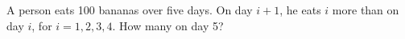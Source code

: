A person eats 100 bananas over five days. On day $i+1$, he eats $i$ more than on day $i$, for $i=1,2,3,4$. How many on day 5?

